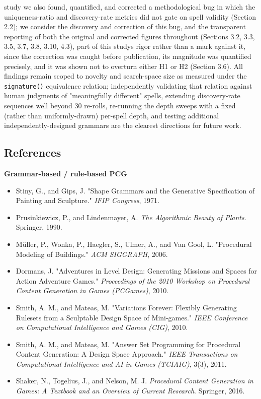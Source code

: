 \documentclass[
  10pt,
  twocolumn]{article}
\providecommand{\tightlist}{%
  \setlength{\itemsep}{0pt}\setlength{\parskip}{0pt}}
\begin{document}
study we also found, quantified, and corrected a methodological bug in
which the uniqueness-ratio and discovery-rate metrics did not gate on
spell validity (Section 2.2); we consider the discovery and correction
of this bug, and the transparent reporting of both the original and
corrected figures throughout (Sections 3.2, 3.3, 3.5, 3.7, 3.8, 3.10,
4.3), part of this study\textquotesingle s rigor rather than a mark
against it, since the correction was caught before publication, its
magnitude was quantified precisely, and it was shown not to overturn
either H1 or H2 (Section 3.6). All findings remain scoped to novelty and
search-space size as measured under the \texttt{signature()} equivalence
relation; independently validating that relation against human judgments
of "meaningfully different" spells, extending discovery-rate sequences
well beyond 30 re-rolls, re-running the depth sweeps with a fixed
(rather than uniformly-drawn) per-spell depth, and testing additional
independently-designed grammars are the clearest directions for future
work.

\subsection{References}\label{references}

\textbf{Grammar-based / rule-based PCG}

\begin{itemize}
\tightlist
\item
  Stiny, G., and Gips, J. "Shape Grammars and the Generative
  Specification of Painting and Sculpture." \emph{IFIP Congress}, 1971.
\item
  Prusinkiewicz, P., and Lindenmayer, A. \emph{The Algorithmic Beauty of
  Plants}. Springer, 1990.
\item
  Müller, P., Wonka, P., Haegler, S., Ulmer, A., and Van Gool, L.
  "Procedural Modeling of Buildings." \emph{ACM SIGGRAPH}, 2006.
\item
  Dormans, J. "Adventures in Level Design: Generating Missions and
  Spaces for Action Adventure Games." \emph{Proceedings of the 2010
  Workshop on Procedural Content Generation in Games (PCGames)}, 2010.
\item
  Smith, A. M., and Mateas, M. "Variations Forever: Flexibly Generating
  Rulesets from a Sculptable Design Space of Mini-games." \emph{IEEE
  Conference on Computational Intelligence and Games (CIG)}, 2010.
\item
  Smith, A. M., and Mateas, M. "Answer Set Programming for Procedural
  Content Generation: A Design Space Approach." \emph{IEEE Transactions
  on Computational Intelligence and AI in Games (TCIAIG)}, 3(3), 2011.
\item
  Shaker, N., Togelius, J., and Nelson, M. J. \emph{Procedural Content
  Generation in Games: A Textbook and an Overview of Current Research}.
  Springer, 2016.
\end{itemize}
\end{document}
